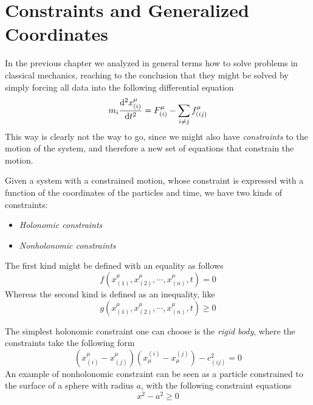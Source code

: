 \documentclass[../admech.tex]{subfiles}
\begin{document}
\section{Constraints and Generalized Coordinates}
In the previous chapter we analyzed in general terms how to solve problems in classical mechanics, reaching to the conclusion that they might be solved by simply forcing all data into the following differential equation
\begin{equation*}
	m_i\dv[2]{x^\mu_{(i)}}{t}=F^\mu_{(i)}-\sum_{i\ne j}f^\mu_{(ij)}
\end{equation*}
This way is clearly not the way to go, since we might also have \emph{constraints} to the motion of the system, and therefore a new set of equations that constrain the motion.\\
\begin{dfn}[Constraints]
	Given a system with a constrained motion, whose constraint is expressed with a function of the coordinates of the particles and time, we have two kinds of constraints:
	\begin{itemize}
	\item \emph{Holonomic constraints}
	\item \emph{Nonholonomic constraints}
	\end{itemize}
	The first kind might be defined with an equality as follows
	\begin{equation}
		f(x^\mu_{(1)},x^\mu_{(2)},\cdots,x^\mu_{(n)},t)=0
		\label{eq:holonomiccon}
	\end{equation}
	Whereas the second kind is defined as an inequality, like
	\begin{equation}
		g(x^\mu_{(1)},x^\mu_{(2)},\cdots,x^\mu_{(n)},t)\ge0
		\label{eq:nonholonomiccon}
	\end{equation}
\end{dfn}
\begin{eg}[Constraints]
	The simplest holonomic constraint one can choose is the \emph{rigid body}, where the constraints take the following form
	\begin{equation}
		(x^\mu_{(i)}-x^\mu_{(j)})(x_\mu^{(i)}-x_\mu^{(j)})-c^2_{(ij)}=0
		\label{eq:rigidbodyconstr}
	\end{equation}
	An example of nonholonomic constraint can be seen as a particle constrained to the surface of a sphere with radius $a$, with the following constraint equations
	\begin{equation}
		x^2-a^2\ge0
		\label{eq:spherenonhol}
	\end{equation}
\end{eg}
\end{document}
